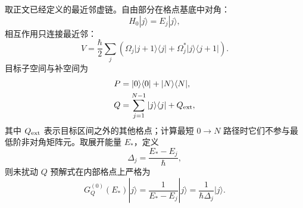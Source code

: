 \begin{derivation}[虚通道链中的有效耦合与能级移动]
取正文已经定义的最近邻虚链。自由部分在格点基底中对角：
\begin{equation*}
 H_0|j\rangle=E_j|j\rangle,
\end{equation*}
相互作用只连接最近邻：
\begin{equation*}
 V
 =\frac{\hbar}{2}\sum_j
 \left(\Omega_j|j+1\rangle\langle j|
 +\Omega_j^*|j\rangle\langle j+1|\right).
\end{equation*}
目标子空间与补空间为
\begin{align*}
 P&=|0\rangle\langle0|+|N\rangle\langle N|,\\
 Q&=\sum_{j=1}^{N-1}|j\rangle\langle j|+Q_{\rm ext},
\end{align*}
其中 $Q_{\rm ext}$ 表示目标区间之外的其他格点；计算最短 $0\to N$ 路径时它们不参与最低阶非对角矩阵元。取展开能量 $E_*$，定义
\begin{equation*}
 \Delta_j=\frac{E_*-E_j}{\hbar},
\end{equation*}
则未扰动 $Q$ 预解式在内部格点上严格为
\begin{equation*}
 G_Q^{(0)}(E_*)|j\rangle
 =\frac1{E_*-E_j}|j\rangle
 =\frac1{\hbar\Delta_j}|j\rangle.
\end{equation*}


\end{derivation}
